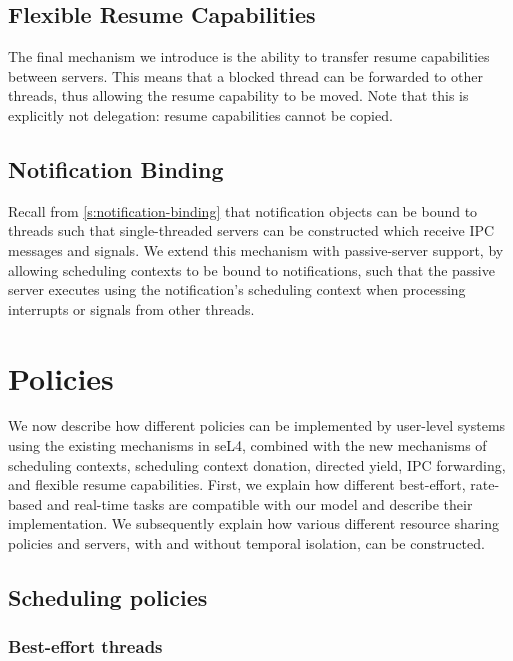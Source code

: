 \subsection{Flexible Resume Capabilities}

The final mechanism we introduce is the ability to transfer resume capabilities between servers. 
This means that a blocked thread can be forwarded to other threads, thus allowing the resume
capability to be moved. Note that this is explicitly not delegation: resume capabilities cannot be
copied.

\subsection{Notification Binding}

Recall from \cref{s:notification-binding} that notification objects can be bound to threads such that single-threaded servers can be 
constructed which receive \gls{IPC} messages and signals. We extend this mechanism with passive-server
support, by allowing scheduling contexts to be bound to notifications, such that the passive server
executes using the notification's scheduling context when processing interrupts or signals from other
threads. 

\section{Policies}
\label{sec:model-policies}

We now describe how different policies can be implemented by user-level systems using the 
existing mechanisms in seL4, combined with the new mechanisms of scheduling contexts,
scheduling context donation, directed yield, \gls{IPC} forwarding, and flexible resume capabilities.
First, we explain how different best-effort, rate-based and real-time tasks are compatible
with our model and describe their implementation. We subsequently explain how various different 
resource sharing policies and servers, with and without temporal isolation, can be constructed. 

\subsection{Scheduling policies}

\subsubsection{Best-effort threads}

